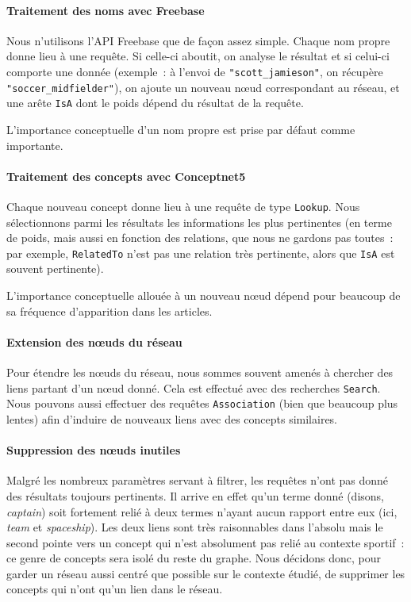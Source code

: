 \documentclass[a4paper, 12pt]{article}
\newcommand{\ang}[1]{\textit{#1}}%
\begin{document}
\paragraph{Traitement des noms avec Freebase}

Nous n'utilisons l'API Freebase que de fa\c{c}on assez simple. Chaque nom propre donne lieu à une requête. Si celle-ci aboutit, on analyse le résultat et si celui-ci comporte une donnée (exemple~: à l'envoi de \verb|"scott_jamieson"|, on récupère \verb|"soccer_midfielder"|), on ajoute un nouveau n\oe{}ud correspondant au réseau, et une arête \verb|IsA| dont le poids dépend du résultat de la requête.

L'importance conceptuelle d'un nom propre est prise par défaut comme importante.

\paragraph{Traitement des concepts avec Conceptnet5}

Chaque nouveau concept donne lieu à une requête de type \verb|Lookup|. Nous sélectionnons parmi les résultats les informations les plus pertinentes (en terme de poids, mais aussi en fonction des relations, que nous ne gardons pas toutes~: par exemple, \verb|RelatedTo| n'est pas une relation très pertinente, alors que \verb|IsA| est souvent pertinente).

L'importance conceptuelle allouée à un nouveau n\oe{}ud dépend pour beaucoup de sa fréquence d'apparition dans les articles.


\paragraph{Extension des nœuds du réseau}

Pour étendre les n\oe{}uds du réseau, nous sommes souvent amenés à chercher des liens partant d'un n\oe{}ud donné. Cela est effectué avec des recherches \verb|Search|. Nous pouvons aussi effectuer des requêtes \verb|Association| (bien que beaucoup plus lentes) afin d'induire de nouveaux liens avec des concepts similaires.



\paragraph{Suppression des nœuds inutiles}

Malgré les nombreux paramètres servant à filtrer, les requêtes n'ont pas donné des résultats toujours pertinents. Il arrive en effet qu'un terme donné (disons, \ang{captain}) soit fortement relié à deux termes n'ayant aucun rapport entre eux (ici, \ang{team} et \ang{spaceship}). Les deux liens sont très raisonnables dans l'absolu mais le second pointe vers un concept qui n'est absolument pas relié au contexte sportif~: ce genre de concepts sera isolé du reste du graphe. Nous décidons donc, pour garder un réseau aussi centré que possible sur le contexte étudié, de supprimer les concepts qui n'ont qu'un lien dans le réseau.
\end{document}
